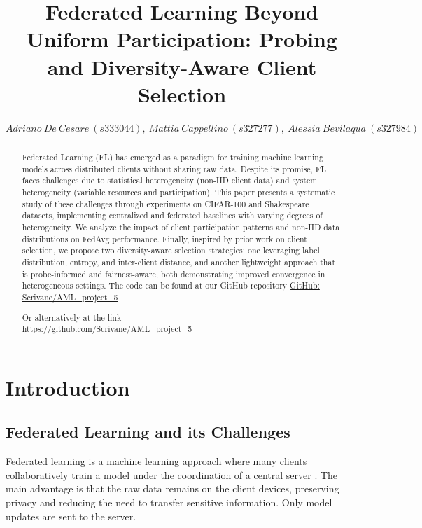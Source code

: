 \documentclass[10pt,twocolumn,letterpaper]{article}
\begin{document}
\title{Federated Learning Beyond Uniform Participation: Probing and Diversity-Aware Client Selection}

\author{
\small{
$Adriano\  De \ Cesare \ (s333044),\  Mattia \  Cappellino\  (s327277), \ Alessia\  Bevilaqua\  (s327984)  
$}
}


\maketitle

\begin{abstract}
  Federated Learning (FL) has emerged as a paradigm for training machine learning models across distributed clients without sharing raw data. 
  Despite its promise, FL faces challenges due to statistical heterogeneity (non-IID client data) and system heterogeneity (variable resources and participation). 
  This paper presents a systematic study of these challenges through experiments on CIFAR-100 and Shakespeare datasets, implementing centralized and federated baselines with varying degrees of heterogeneity. 
  We analyze the impact of client participation patterns and non-IID data distributions on FedAvg performance. 
  Finally, inspired by prior work on client selection, we propose two diversity-aware selection strategies: one leveraging label distribution, entropy, and inter-client distance, and another lightweight approach that is probe-informed and fairness-aware, both demonstrating improved convergence in heterogeneous settings. 
The code can be found at our GitHub repository
  \href{https://github.com/Scrivane/AML_project_5}{GitHub: Scrivane/AML\_project\_5}
  
\text Or alternatively at the link\\
\href{https://github.com/Scrivane/AML\_project\_5}{https://github.com/Scrivane/AML\_project\_5}
\end{abstract}


\section{Introduction}
\label{sec:intro}
\subsection{Federated Learning and its Challenges}
Federated learning is a machine learning approach where many clients collaboratively train a model under the coordination of a central server \cite{kairouz2021advances}. The main advantage is that the raw data remains on the client devices, preserving privacy and reducing the need to transfer sensitive information. Only model updates are sent to the server.
\end{document}
